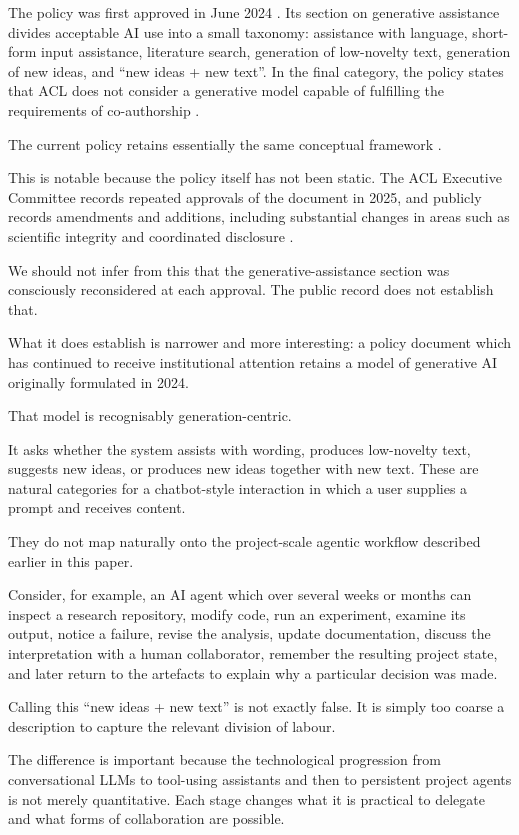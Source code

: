 The policy was first approved in June 2024 \citep{acl2024policy}. Its section on generative assistance divides acceptable AI use into a small taxonomy: assistance with language, short-form input assistance, literature search, generation of low-novelty text, generation of new ideas, and ``new ideas + new text''. In the final category, the policy states that ACL does not consider a generative model capable of fulfilling the requirements of co-authorship \citep{acl2024policy}.

The current policy retains essentially the same conceptual framework \citep{acl2026policy}.

This is notable because the policy itself has not been static. The ACL Executive Committee records repeated approvals of the document in 2025, and publicly records amendments and additions, including substantial changes in areas such as scientific integrity and coordinated disclosure \citep{acl2026policy,aclresolutions2025}.

We should not infer from this that the generative-assistance section was consciously reconsidered at each approval. The public record does not establish that.

What it does establish is narrower and more interesting: a policy document which has continued to receive institutional attention retains a model of generative AI originally formulated in 2024.

That model is recognisably generation-centric.

It asks whether the system assists with wording, produces low-novelty text, suggests new ideas, or produces new ideas together with new text. These are natural categories for a chatbot-style interaction in which a user supplies a prompt and receives content.

They do not map naturally onto the project-scale agentic workflow described earlier in this paper.

Consider, for example, an AI agent which over several weeks or months can inspect a research repository, modify code, run an experiment, examine its output, notice a failure, revise the analysis, update documentation, discuss the interpretation with a human collaborator, remember the resulting project state, and later return to the artefacts to explain why a particular decision was made.

Calling this ``new ideas + new text'' is not exactly false. It is simply too coarse a description to capture the relevant division of labour.

The difference is important because the technological progression from conversational LLMs to tool-using assistants and then to persistent project agents is not merely quantitative. Each stage changes what it is practical to delegate and what forms of collaboration are possible.

